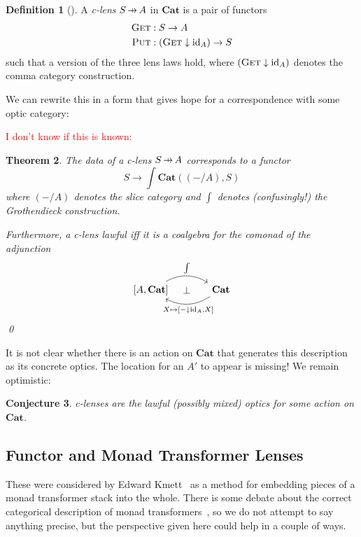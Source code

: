 \documentclass[11pt,letterpaper]{article}
\theoremstyle{plain}
\newtheorem{theorem}{Theorem}[subsection]
\newtheorem{conjecture}[theorem]{Conjecture}
\theoremstyle{definition}
\newtheorem{definition}[theorem]{Definition}
\newcommand{\Cat}{\mathbf{Cat}}
\newcommand{\id}{\mathrm{id}}
\newcommand{\fget}{\textsc{Get}}
\newcommand{\fput}{\textsc{Put}}
\newcommand{\hto}{\ensuremath{\,\mathaccent\shortmid\rightarrow\,}}
\newcommand{\todo}[1]{\textcolor{red}{\small #1}}
\begin{document}
\begin{definition}[{\cite[Definition 4.1]{LensesFibrationsAndUniversalTranslations}}]
A \emph{c-lens} $S \hto A$ in $\Cat$ is a pair of functors 
\begin{align*}
\fget &: S \to A \\
\fput &: (\fget \downarrow \id_{A}) \to S
\end{align*}
such that a version of the three lens laws hold, where $(\fget \downarrow \id_{A})$ denotes the comma category construction. 
\end{definition}

We can rewrite this in a form that gives hope for a correspondence with some optic category:

\todo{I don't know if this is known:}
\begin{theorem}
The data of a c-lens $S \hto A$ corresponds to a functor \[ S \to \int \Cat ((- / A), S) \] where $(-/A)$ denotes the slice category and $\int$ denotes (confusingly!) the Grothendieck construction.

Furthermore, a c-lens lawful iff it is a coalgebra for the comonad of the adjunction
\[
\begin{tikzcd}[column sep = large]
{[A, \Cat]} \ar[r, bend left, "\int"] \ar[r, phantom, "\bot" pos = 0.4] & \Cat \ar[l, bend left, "{X \mapsto [- \downarrow \id_A, X]}" below]
\end{tikzcd}
\]
\qed
\end{theorem}

It is not clear whether there is an action on $\Cat$ that generates this description as its concrete optics. The location for an $A'$ to appear is missing! We remain optimistic:

\begin{conjecture}
c-lenses are the lawful (possibly mixed) optics for some action on $\Cat$.
\end{conjecture}

\subsection{Functor and Monad Transformer Lenses} 
These were considered by Edward Kmett~\cite{MonadTransformerLensesTalk}  as a method for embedding pieces of a monad transformer stack into the whole. There is some debate about the correct categorical description of monad transformers~\cite{MonadTransformersAsMonoidTransformers, CalculatingMonadTransformersCategoryTheory}, so we do not attempt to say anything precise, but the perspective given here could help in a couple of ways.
\end{document}
